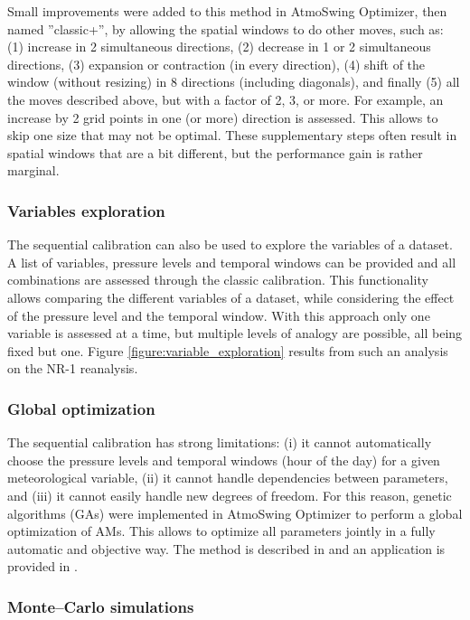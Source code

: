 \documentclass[review]{elsarticle}
\begin{document}
Small improvements were added to this method in AtmoSwing Optimizer, then named ''classic+'', by allowing the spatial windows to do other moves, such as: (1) increase in 2 simultaneous directions, (2) decrease in 1 or 2 simultaneous directions, (3) expansion or contraction (in every direction), (4) shift of the window (without resizing) in 8 directions (including diagonals), and finally (5) all the moves described above, but with a factor of 2, 3, or more. For example, an increase by 2 grid points in one (or more) direction is assessed. This allows to skip one size that may not be optimal. These supplementary steps often result in spatial windows that are a bit different, but the performance gain is rather marginal.


\subsubsection{Variables exploration}
\label{sec:vars-explo}

The sequential calibration can also be used to explore the variables of a dataset. A list of variables, pressure levels and temporal windows can be provided and all combinations are assessed through the classic calibration. This functionality allows comparing the different variables of a dataset, while considering the effect of the pressure level and the temporal window. With this approach only one variable is assessed at a time, but multiple levels of analogy are possible, all being fixed but one. Figure \ref{figure:variable_exploration} results from such an analysis on the NR-1 reanalysis.


\subsubsection{Global optimization}
\label{sec:global-optimization}

The sequential calibration has strong limitations: (i) it cannot automatically choose the pressure levels and temporal windows (hour of the day) for a given meteorological variable, (ii) it cannot handle dependencies between parameters, and (iii) it cannot easily handle new degrees of freedom. For this reason, genetic algorithms (GAs) were implemented in AtmoSwing Optimizer to perform a global optimization of AMs. This allows to optimize all parameters jointly in a fully automatic and objective way. The method is described in \citet{Horton2017a} and an application is provided in \citet{Horton2018a}.


\subsubsection{Monte--Carlo simulations}
\label{sec:monte-carlo}
\end{document}
